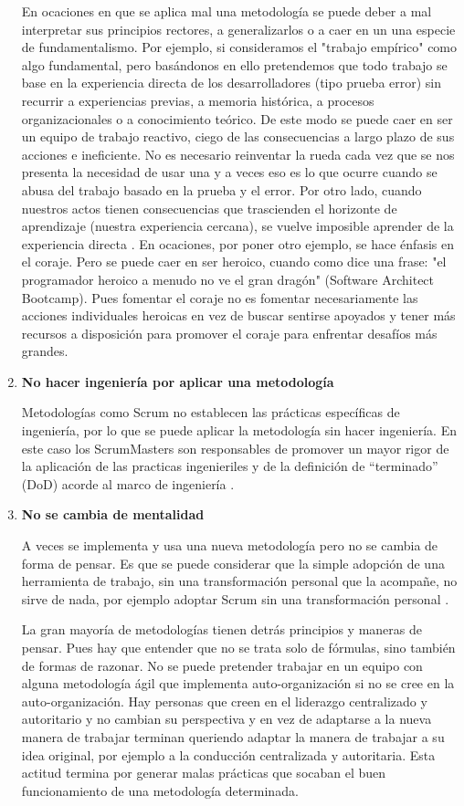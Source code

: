 \begin{enumerate}
En ocaciones en que se aplica mal una metodología se puede deber a mal interpretar sus principios rectores, a generalizarlos o a caer en un una especie de fundamentalismo. Por ejemplo, si consideramos el "trabajo empírico" como algo fundamental, pero basándonos en ello pretendemos que todo trabajo se base en la experiencia directa de los desarrolladores (tipo prueba error) sin recurrir a experiencias previas, a memoria histórica, a procesos organizacionales o a conocimiento teórico. De este modo se puede caer en ser un equipo de trabajo reactivo, ciego de las consecuencias a largo plazo de sus acciones e ineficiente. No es necesario reinventar la rueda cada vez que se nos presenta la necesidad de usar una y a veces eso es lo que ocurre cuando se abusa del trabajo basado en la prueba y el error. Por otro lado, cuando nuestros actos tienen consecuencias que trascienden el horizonte de aprendizaje (nuestra experiencia cercana), se vuelve imposible aprender de la experiencia directa \cite{Peter-Senge-1990}. 
En ocaciones, por poner otro ejemplo, se hace énfasis en el coraje. Pero se puede caer en ser heroico, cuando como dice una frase: "el programador heroico a menudo no ve el gran dragón" (Software Architect Bootcamp). Pues fomentar el coraje no es fomentar necesariamente las acciones individuales heroicas en vez de buscar sentirse apoyados y tener más recursos a disposición para promover el coraje para enfrentar desafíos más grandes.

\item \textbf{No hacer ingeniería por aplicar una metodología}

Metodologías como Scrum  no establecen las prácticas específicas de ingeniería, por lo que se puede aplicar la metodología sin hacer ingeniería. En este caso los ScrumMasters son responsables de promover un mayor rigor de la aplicación de las practicas ingenieriles y de la definición de “terminado” (DoD) acorde al marco de ingeniería \cite{Gantthead-James-2010}.

\item \textbf{No se cambia de mentalidad}

A veces se implementa y usa una nueva metodología pero no se cambia de forma de pensar. Es que se puede considerar que la simple adopción de una herramienta de trabajo, sin una transformación personal que la acompañe, no sirve de nada, por ejemplo adoptar Scrum sin una transformación personal \cite{Martin-Alaimo-Kleer-2014}. 

La gran mayoría de metodologías tienen detrás principios y maneras de pensar. Pues hay que entender que no se trata solo de fórmulas, sino también de formas de razonar. No se puede pretender trabajar en un equipo con alguna metodología ágil que implementa auto-organización si no se cree en la auto-organización. Hay personas que creen en el liderazgo centralizado y autoritario y no cambian su perspectiva y en vez de adaptarse a la nueva manera de trabajar terminan queriendo adaptar la manera de trabajar a su idea original, por ejemplo a la conducción centralizada y autoritaria. Esta actitud termina por generar malas prácticas que socaban el buen funcionamiento de una metodología determinada.


\end{enumerate}
